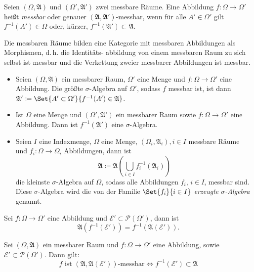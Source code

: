 \documentclass{cheat-sheet}
\newcommand{\Alg}{\mathfrak{A}} %
\begin{document}
\begin{defn}
  Seien $(\Omega, \Alg)$ und $(\Omega', \Alg')$ zwei messbare Räume. Eine Abbildung $f : \Omega \to \Omega'$ heißt \emph{messbar} oder genauer $(\Alg, \Alg')$-messbar, wenn für alle $A' \in \Omega'$ gilt $f^{-1}(A') \in \Omega$ oder, kürzer, $f^{-1}(\Alg') \subset \Alg$.
\end{defn}

\begin{bem}
  Die messbaren Räume bilden eine Kategorie mit messbaren Abbildungen als Morphismen, d.\,h. die Identitäts- abbildung von einem messbaren Raum zu sich selbst ist messbar und die Verkettung zweier messbarer Abbildungen ist messbar.
\end{bem}

\begin{satz}
  \begin{itemize}
    \item Seien $(\Omega, \Alg)$ ein messbarer Raum, $\Omega'$ eine Menge und $f : \Omega \to \Omega'$ eine Abbildung. Die größte $\sigma$-Algebra auf $\Omega'$, sodass $f$ messbar ist, ist dann $\Alg' \coloneqq \Set{ A' \subset \Omega' }{ f^{-1}(A') \in \Alg }$.
    \item Ist $\Omega$ eine Menge und $(\Omega', \Alg')$ ein messbarer Raum sowie $f : \Omega \to \Omega'$ eine Abbildung. Dann ist $f^{-1}(\Alg')$ eine $\sigma$-Algebra.
    \item Seien $I$ eine Indexmenge, $\Omega$ eine Menge, $(\Omega_i, \Alg_i), i \in I$ messbare Räume und $f_i : \Omega \to \Omega_i$ Abbildungen, dann ist
    \[ \Alg \coloneqq \Alg\left( \bigcup_{i \in I} f_i^{-1}(\Alg_i) \right) \]
    die kleinste $\sigma$-Algebra auf $\Omega$, sodass alle Abbildungen $f_i$, $i \in I$, messbar sind. Diese $\sigma$-Algebra wird die von der Familie $\Set{ f_i }{i \in I}$ \emph{erzeugte $\sigma$-Algebra} genannt.
  \end{itemize}
\end{satz}

\begin{satz}
  Sei $f : \Omega \to \Omega'$ eine Abbildung und $\mathcal{E}' \subset \mathcal{P}(\Omega')$, dann ist
  \[ \Alg(f^{-1}(\mathcal{E}')) = f^{-1}(\Alg(\mathcal{E}')). \]
\end{satz}

\begin{satz}
  Sei $(\Omega, \Alg)$ ein messbarer Raum und $f : \Omega \to \Omega'$ eine Abbildung, sowie $\mathcal{E'} \subset \mathcal{P}(\Omega')$. Dann gilt:
  \[ f \text{ ist } (\Alg, \Alg(\mathcal{E}')) \text{-messbar} \iff f^{-1}(\mathcal{E}') \subset \Alg \]
\end{satz}
\end{document}
